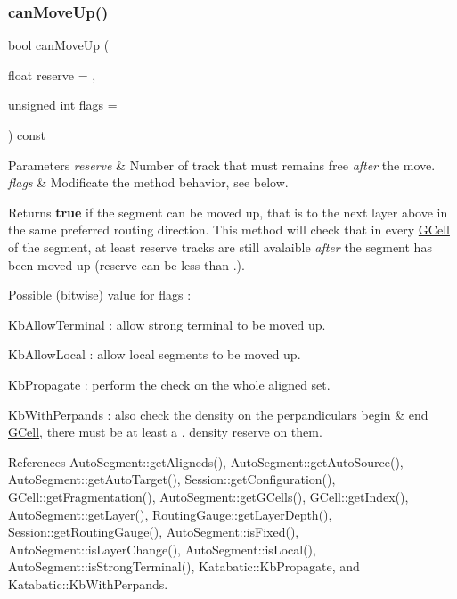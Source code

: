\subsubsection{\texorpdfstring{can\+Move\+Up()}{canMoveUp()}}
{\footnotesize\ttfamily bool can\+Move\+Up (\begin{DoxyParamCaption}\item[{float}]{reserve = {},  }\item[{unsigned int}]{flags = {} }\end{DoxyParamCaption}) const}


\begin{DoxyParams}{Parameters}
{\em reserve} & Number of track that must remains free {\itshape after} the move. \\
\hline
{\em flags} & Modificate the method behavior, see below. \\
\hline
\end{DoxyParams}
\begin{DoxyReturn}{Returns}
{\bfseries true} if the segment can be moved up, that is to the next layer above in the same preferred routing direction. This method will check that in every \mbox{\hyperlink{classKatabatic_1_1GCell}{G\+Cell}} of the segment, at least {\ttfamily reserve} tracks are still avalaible {\itshape after} the segment has been moved up ({\ttfamily reserve} can be less than {.}).
\end{DoxyReturn}
Possible (bitwise) value for {\ttfamily flags} \+:
\begin{DoxyItemize}
\item {\ttfamily Kb\+Allow\+Terminal} \+: allow strong terminal to be moved up.
\item {\ttfamily Kb\+Allow\+Local} \+: allow local segments to be moved up.
\item {\ttfamily Kb\+Propagate} \+: perform the check on the whole aligned set.
\item {\ttfamily Kb\+With\+Perpands} \+: also check the density on the perpandiculars begin \& end \mbox{\hyperlink{classKatabatic_1_1GCell}{G\+Cell}}, there must be at least a {.} density reserve on them. 
\end{DoxyItemize}

References Auto\+Segment\+::get\+Aligneds(), Auto\+Segment\+::get\+Auto\+Source(), Auto\+Segment\+::get\+Auto\+Target(), Session\+::get\+Configuration(), G\+Cell\+::get\+Fragmentation(), Auto\+Segment\+::get\+G\+Cells(), G\+Cell\+::get\+Index(), Auto\+Segment\+::get\+Layer(), Routing\+Gauge\+::get\+Layer\+Depth(), Session\+::get\+Routing\+Gauge(), Auto\+Segment\+::is\+Fixed(), Auto\+Segment\+::is\+Layer\+Change(), Auto\+Segment\+::is\+Local(), Auto\+Segment\+::is\+Strong\+Terminal(), Katabatic\+::\+Kb\+Propagate, and Katabatic\+::\+Kb\+With\+Perpands.

